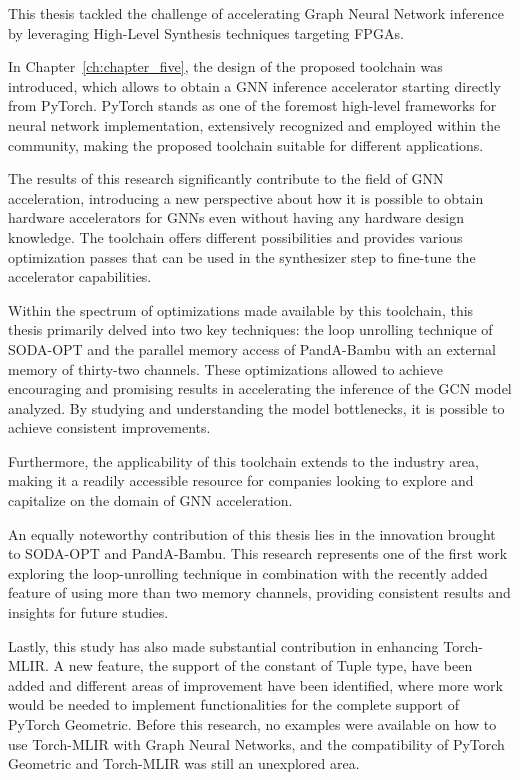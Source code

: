 This thesis tackled the challenge of accelerating Graph Neural Network inference by leveraging High-Level Synthesis techniques targeting FPGAs.

In Chapter~\ref{ch:chapter_five}, the design of the proposed toolchain was introduced, which allows to obtain a GNN inference accelerator starting directly from PyTorch.
PyTorch stands as one of the foremost high-level frameworks for neural network implementation, extensively recognized and employed within the community, making the proposed toolchain suitable for different applications.

The results of this research significantly contribute to the field of GNN acceleration, introducing a new perspective about how it is possible to obtain hardware accelerators for GNNs even without having any hardware design knowledge.
The toolchain offers different possibilities and provides various optimization passes that can be used in the synthesizer step to fine-tune the accelerator capabilities.

Within the spectrum of optimizations made available by this toolchain, this thesis primarily delved into two key techniques: the loop unrolling technique of SODA-OPT and the parallel memory access of PandA-Bambu with an external memory of thirty-two channels.
These optimizations allowed to achieve encouraging and promising results in accelerating the inference of the GCN model analyzed.
By studying and understanding the model bottlenecks, it is possible to achieve consistent improvements.

Furthermore, the applicability of this toolchain extends to the industry area, making it a readily accessible resource for companies looking to explore and capitalize on the domain of GNN acceleration.

An equally noteworthy contribution of this thesis lies in the innovation brought to SODA-OPT and PandA-Bambu.
This research represents one of the first work exploring the loop-unrolling technique in combination with the recently added feature of using more than two memory channels, providing consistent results and insights for future studies.

Lastly, this study has also made substantial contribution in enhancing Torch-MLIR\@.
A new feature, the support of the constant of Tuple type, have been added and different areas of improvement have been identified, where more work would be needed to implement functionalities for the complete support of PyTorch Geometric.
Before this research, no examples were available on how to use Torch-MLIR with Graph Neural Networks, and the compatibility of PyTorch Geometric and Torch-MLIR was still an unexplored area.

